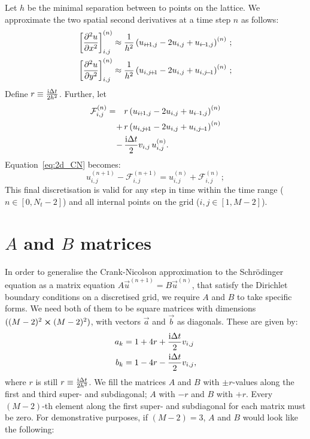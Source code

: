 Let $h$ be the minimal separation between to points on the lattice. We approximate the two spatial second derivatives at a time step $n$ as follows:
\begin{subequations}
    \begin{align}
        \bracket{\pdv[2]{u}{x}}_{i,j}^{(n)} \approx \frac{1}{h^2} \closed{u_{i\!+\!1, j}-2u_{i,j} + u_{i\!-\!1, j}}^{(n)}\, ;\\
        \bracket{\pdv[2]{u}{y}}_{i,j}^{(n)} \approx \frac{1}{h^2} \closed{u_{i, j\!+\!1}-2u_{i,j} + u_{i, j\!-\!1}}^{(n)}\, ;
    \end{align}
\end{subequations}
Define $r\equiv \frac{\mathrm{i} \Delta t}{2h^2}$. Further, let
\begin{equation}
    \begin{split}
    \mathcal{F}_{i,j}^{(n)} = \quad&r\closed{ u_{i\!+\!1, j}-2u_{i,j} + u_{i\!-\!1, j}}^{(n)}  \\
    +\,&  r\closed{u_{i,j\!+\!1}-2u_{i,j} + u_{i,j\!-\!1}}^{(n)}\\ 
    -\,& \frac{\im \Delta t}{2} v_{i,j}\,u_{i,j}^{(n)}.
    \end{split}
\end{equation}
Equation~\eqref{eq:2d_CN} becomes:
\begin{equation}\label{eq:final_CN_scheme}
    u_{i,j}^{(n+1)} - \mathcal{F}_{i,j}^{(n+1)} = u_{i, j}^{(n)} + \mathcal{F}_{i,j}^{(n)} \, ;
\end{equation}
This final discretisation is valid for any step in time within the time range ($n\in[0, N_t-2]$) and all internal points on the grid ($i,j \in [1, M-2]$).


\newpage

\section{$A$ and $B$ matrices}\label{app:A_and_B}
    In order to generalise the Crank-Nicolson approximation to the Schrödinger equation as a matrix equation $A\vec{u}^{(n+1)} = B\vec{u}^{(n)}$, that satisfy the Dirichlet boundary conditions on a discretised grid, we require $A$ and $B$ to take specific forms. We need both of them to be square matrices with dimensions $((M-2)^2\cross(M-2)^2)$, with vectors $\vec{a}$ and $\vec{b}$ as diagonals. These are given by:
    \begin{equation}
        \begin{split}
            a_k &= 1+4r +\frac{\mathrm{i}\Delta t}{2}v_{i,j} \\
            b_k &= 1-4r -\frac{\mathrm{i}\Delta t}{2}v_{i,j},
        \end{split}
    \end{equation}
    where $r$ is still $r\equiv \frac{\mathrm{i}\Delta t}{2h^2}$. We fill the matrices $A$ and $B$ with $\pm r$-values along the first and third super- and subdiagonal; $A$ with $-r$ and $B$ with $+r$. Every $(M-2)$-th element along the first super- and subdiagonal for each matrix must be zero. For demonstrative purposes, if $(M-2)=3$, $A$ and $B$ would look like the following:

